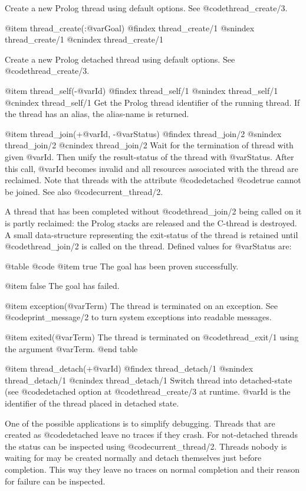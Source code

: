 {{{{{{{{{Create a new Prolog thread using default options. See @code{thread_create/3}.

@item thread_create(:@var{Goal})
@findex thread_create/1
@snindex thread_create/1
@cnindex thread_create/1

Create a new Prolog detached thread using default options. See @code{thread_create/3}.

@item thread_self(-@var{Id})
@findex thread_self/1
@snindex thread_self/1
@cnindex thread_self/1
Get the Prolog thread identifier of the running thread.  If the thread
has an alias, the alias-name is returned.

@item thread_join(+@var{Id}, -@var{Status})
@findex thread_join/2
@snindex thread_join/2
@cnindex thread_join/2
Wait for the termination of thread with given @var{Id}.  Then unify the
result-status of the thread with @var{Status}.  After this call,
@var{Id} becomes invalid and all resources associated with the thread
are reclaimed.  Note that threads with the attribute @code{detached}
@code{true} cannot be joined.  See also @code{current_thread/2}.

A thread that has been completed without @code{thread_join/2} being
called on it is partly reclaimed: the Prolog stacks are released and the
C-thread is destroyed. A small data-structure representing the
exit-status of the thread is retained until @code{thread_join/2} is called on
the thread.  Defined values for @var{Status} are:

@table @code
    @item true
The goal has been proven successfully.

    @item false
The goal has failed.

    @item exception(@var{Term})
 The thread is terminated on an
exception.  See @code{print_message/2} to turn system exceptions into
readable messages.

    @item exited(@var{Term})
The thread is terminated on @code{thread_exit/1} using the argument @var{Term}.
@end table


@item thread_detach(+@var{Id})
@findex thread_detach/1
@snindex thread_detach/1
@cnindex thread_detach/1
Switch thread into detached-state (see @code{detached} option at
@code{thread_create/3} at runtime.  @var{Id} is the identifier of the thread
placed in detached state.

One of the possible applications is to simplify debugging. Threads that
are created as @code{detached} leave no traces if they crash. For
not-detached threads the status can be inspected using
@code{current_thread/2}.  Threads nobody is waiting for may be created
normally and detach themselves just before completion.  This way they
leave no traces on normal completion and their reason for failure can be
inspected.

}}}}}}}}}
